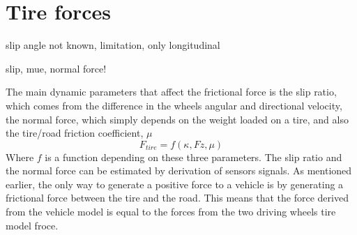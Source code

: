 \section{Tire forces}

slip angle not known, limitation, only longitudinal

slip, mue, normal force!

The main dynamic parameters that affect the frictional force is the slip ratio, which comes from the difference in the wheels angular and  directional velocity, the normal force, which simply depends on the weight loaded on a tire, and also the tire/road friction coefficient, $ \mu $
\begin{equation}
	F_{tire} = f(\kappa, Fz, \mu)
\end{equation}
Where $ f $ is a function depending on these three parameters. The slip ratio and the normal force can be estimated by derivation of sensors signals. As mentioned earlier, the only way to generate a positive force to a vehicle is by generating a frictional force between the tire and the road. This means that the force derived from the vehicle model is equal to the forces from the two driving wheels tire model froce.
